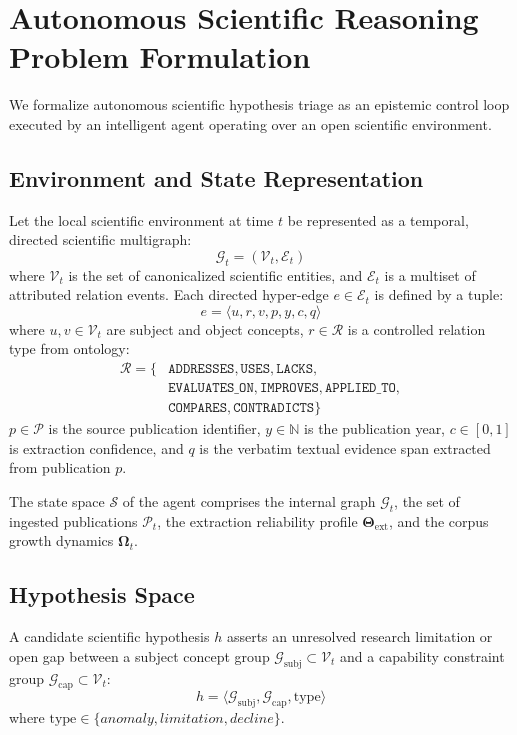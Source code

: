 \documentclass[conference,10pt]{IEEEtran}
\begin{document}
\section{Autonomous Scientific Reasoning Problem Formulation}

We formalize autonomous scientific hypothesis triage as an epistemic control loop executed by an intelligent agent operating over an open scientific environment.

\subsection{Environment and State Representation}
Let the local scientific environment at time $t$ be represented as a temporal, directed scientific multigraph:
\begin{equation}
\mathcal{G}_t = (\mathcal{V}_t, \mathcal{E}_t)
\end{equation}
where $\mathcal{V}_t$ is the set of canonicalized scientific entities, and $\mathcal{E}_t$ is a multiset of attributed relation events. Each directed hyper-edge $e \in \mathcal{E}_t$ is defined by a tuple:
\begin{equation}
e = \langle u, r, v, p, y, c, q \rangle
\end{equation}
where $u, v \in \mathcal{V}_t$ are subject and object concepts, $r \in \mathcal{R}$ is a controlled relation type from ontology:
\begin{equation}
\begin{aligned}
\mathcal{R} = \{&\texttt{ADDRESSES}, \texttt{USES}, \texttt{LACKS}, \\
&\texttt{EVALUATES\_ON}, \texttt{IMPROVES}, \texttt{APPLIED\_TO}, \\
&\texttt{COMPARES}, \texttt{CONTRADICTS}\}
\end{aligned}
\end{equation}
$p \in \mathcal{P}$ is the source publication identifier, $y \in \mathbb{N}$ is the publication year, $c \in [0, 1]$ is extraction confidence, and $q$ is the verbatim textual evidence span extracted from publication $p$.

The state space $\mathcal{S}$ of the agent comprises the internal graph $\mathcal{G}_t$, the set of ingested publications $\mathcal{P}_t$, the extraction reliability profile $\mathbf{\Theta}_{\text{ext}}$, and the corpus growth dynamics $\mathbf{\Omega}_t$.

\subsection{Hypothesis Space}
A candidate scientific hypothesis $h$ asserts an unresolved research limitation or open gap between a subject concept group $\mathcal{G}_{\text{subj}} \subset \mathcal{V}_t$ and a capability constraint group $\mathcal{G}_{\text{cap}} \subset \mathcal{V}_t$:
\begin{equation}
h = \langle \mathcal{G}_{\text{subj}}, \mathcal{G}_{\text{cap}}, \text{type} \rangle
\end{equation}
where $\text{type} \in \{\textit{anomaly}, \textit{limitation}, \textit{decline}\}$.
\end{document}
